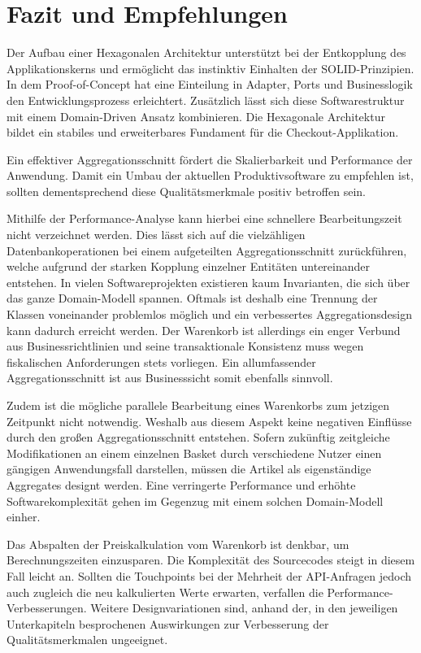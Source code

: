 

\chapter{Fazit und Empfehlungen}

Der Aufbau einer Hexagonalen Architektur unterstützt bei der Entkopplung des Applikationskerns und ermöglicht das instinktiv Einhalten der SOLID-Prinzipien. In dem Proof-of-Concept hat eine Einteilung in Adapter, Ports und Businesslogik den Entwicklungsprozess erleichtert. Zusätzlich lässt sich diese Softwarestruktur mit einem Domain-Driven Ansatz kombinieren. Die Hexagonale Architektur bildet ein stabiles und erweiterbares Fundament für die Checkout-Applikation.

Ein effektiver Aggregationsschnitt fördert die Skalierbarkeit und Performance der Anwendung. Damit ein Umbau der aktuellen Produktivsoftware zu empfehlen ist, sollten dementsprechend diese Qualitätsmerkmale positiv betroffen sein. 

Mithilfe der Performance-Analyse kann hierbei eine schnellere Bearbeitungszeit nicht verzeichnet werden. Dies lässt sich auf die vielzähligen Datenbankoperationen bei einem aufgeteilten Aggregationsschnitt zurückführen, welche aufgrund der starken Kopplung einzelner Entitäten untereinander entstehen. In vielen Softwareprojekten existieren kaum Invarianten, die sich über das ganze Domain-Modell spannen. Oftmals ist deshalb eine Trennung der Klassen voneinander problemlos möglich und ein verbessertes Aggregationsdesign kann dadurch erreicht werden. Der Warenkorb ist allerdings ein enger Verbund aus Businessrichtlinien und seine transaktionale Konsistenz muss wegen fiskalischen Anforderungen stets vorliegen. Ein allumfassender Aggregationsschnitt ist aus Businesssicht somit ebenfalls sinnvoll.

Zudem ist die mögliche parallele Bearbeitung eines Warenkorbs zum jetzigen Zeitpunkt nicht notwendig. Weshalb aus diesem Aspekt keine negativen Einflüsse durch den großen Aggregationsschnitt entstehen. Sofern zukünftig zeitgleiche Modifikationen an einem einzelnen Basket durch verschiedene Nutzer einen gängigen Anwendungsfall darstellen, müssen die Artikel als eigenständige Aggregates designt werden. Eine verringerte Performance und erhöhte Softwarekomplexität gehen im Gegenzug mit einem solchen Domain-Modell einher.

Das Abspalten der Preiskalkulation vom Warenkorb ist denkbar, um Berechnungszeiten einzusparen. Die Komplexität des Sourcecodes steigt in diesem Fall leicht an. Sollten die Touchpoints bei der Mehrheit der API-Anfragen jedoch auch zugleich die neu kalkulierten Werte erwarten, verfallen die Performance-Verbesserungen. Weitere Designvariationen sind, anhand der, in den jeweiligen Unterkapiteln besprochenen Auswirkungen zur Verbesserung der Qualitätsmerkmalen ungeeignet.

